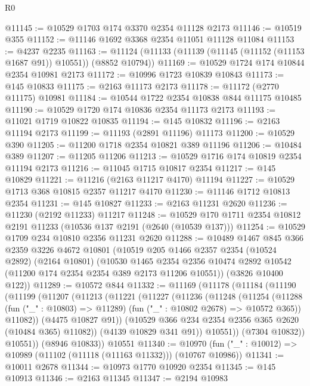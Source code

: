 \begin{lexlean}{R0}
\begin{coremodule}
@11145 := @10529 @1703 @174 @3370 @2354 @11128 @2173
@11146 := @10519 @355
@11152 := @11146 @1692 @3368 @2354 @11051 @11128 @11084
@11153 := @4237 @2235
@11163 := @11124 (@11133 (@11139 (@11145 (@11152 (@11153 @1687 @91)) @10551)) (@8852 @10794))
@11169 := @10529 @1724 @174 @10844 @2354 @10981 @2173
@11172 := @10996 @1723 @10839 @10843
@11173 := @145 @10833
@11175 := @2163 @11173 @2173
@11178 := @11172 (@2770 @11175) @10981
@11184 := @10544 @1722 @2354 @10838 @844 @11175 @10485
@11190 := @10529 @1720 @174 @10836 @2354 @11173 @2173
@11193 := @11021 @1719 @10822 @10835
@11194 := @145 @10832
@11196 := @2163 @11194 @2173
@11199 := @11193 (@2891 @11196) @11173
@11200 := @10529 @390
@11205 := @11200 @1718 @2354 @10821 @389 @11196
@11206 := @10484 @389
@11207 := @11205 @11206
@11213 := @10529 @1716 @174 @10819 @2354 @11194 @2173
@11216 := @11045 @1715 @10817 @2354
@11217 := @145 @10829
@11221 := @11216 (@2163 @11217 @4170) @11194
@11227 := @10529 @1713 @368 @10815 @2357 @11217 @4170
@11230 := @11146 @1712 @10813 @2354
@11231 := @145 @10827
@11233 := @2163 @11231 @2620
@11236 := @11230 (@2192 @11233) @11217
@11248 := @10529 @170 @1711 @2354 @10812 @2191 @11233 (@10536 @137 @2191 (@2640 (@10539 @137)))
@11254 := @10529 @1709 @234 @10810 @2356 @11231 @2620
@11288 := @10489
    @1467
    @845
    @366
    @2359
    @3226
    @4672
    @10801
    (@10519
      @205
      @1466
      @2357
      @2354
      (@10524 @2892)
      (@2164 @10801)
      (@10530
        @1465
        @2354
        @2356
        @10474
        @2892
        @10542
        (@11200 @174 @2354 @2354 @389 @2173 @11206 @10551))
      (@3826 @10400 @122))
@11289 := @10572 @844
@11332 := @11169
    (@11178
      (@11184
        (@11190
          (@11199
            (@11207
              (@11213
                (@11221
                  (@11227
                    (@11236
                      (@11248
                        (@11254
                          (@11288
                            (fun ("_" : @10803) => @11289)
                            (fun ("_" : @10802 @2678) => @10572 @365))
                          @11082))
                      (@4475 @10827 @91))
                    (@10529 @366 @234 @2354 @2356 @365 @2620 (@10484 @365) @11082))
                  (@4139 @10829 @341 @91))
                @10551))
            (@7304 @10832))
          @10551))
      (@8946 @10833))
    @10551
@11340 := @10970 (fun ("_" : @10012) => @10989 (@11102 (@11118 (@11163 @11332))) (@10767 @10986))
@11341 := @10011 @2678
@11344 := @10973 @1770 @10920 @2354
@11345 := @145 @10913
@11346 := @2163 @11345
@11347 := @2194 @10983

\end{coremodule}
\end{lexlean}

